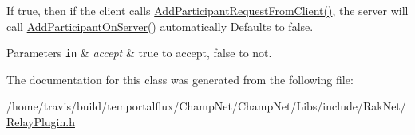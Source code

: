 If true, then if the client calls \hyperlink{class_rak_net_1_1_relay_plugin_a8f0d6808a2fed5dcfabb1c2435ae736e}{Add\-Participant\-Request\-From\-Client()}, the server will call \hyperlink{class_rak_net_1_1_relay_plugin_a8a8b10be11428da1b26e0f9a9e1e133e}{Add\-Participant\-On\-Server()} automatically Defaults to false. 


\begin{DoxyParams}[1]{Parameters}
\mbox{\tt in}  & {\em accept} & true to accept, false to not. \\
\hline
\end{DoxyParams}


The documentation for this class was generated from the following file\-:\begin{DoxyCompactItemize}
\item 
/home/travis/build/temportalflux/\-Champ\-Net/\-Champ\-Net/\-Libs/include/\-Rak\-Net/\hyperlink{_relay_plugin_8h}{Relay\-Plugin.\-h}\end{DoxyCompactItemize}
